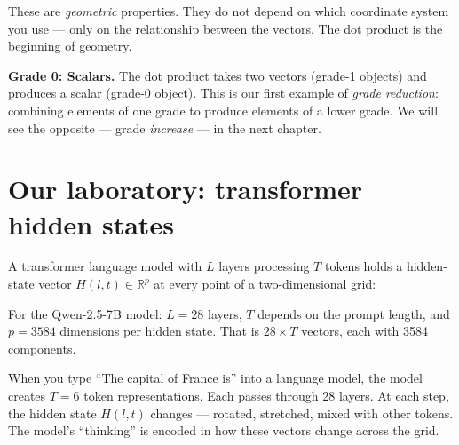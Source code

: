\documentclass[11pt, twoside, openright]{memoir}
\begin{document}
These are \emph{geometric} properties.  They do not depend on which
coordinate system you use --- only on the relationship between the
vectors.  The dot product is the beginning of geometry.

\begin{gabox}
\textbf{Grade 0: Scalars.}
The dot product takes two vectors (grade-1 objects) and produces a
scalar (grade-0 object).  This is our first example of \emph{grade
reduction}: combining elements of one grade to produce elements of a
lower grade.  We will see the opposite --- grade \emph{increase} --- in
the next chapter.
\end{gabox}

\section{Our laboratory: transformer hidden states}

A transformer language model with $L$ layers processing $T$ tokens holds
a hidden-state vector $H(l, t) \in \mathbb{R}^p$ at every point of a
two-dimensional grid:

\begin{center}
\end{center}

For the Qwen-2.5-7B model: $L = 28$ layers, $T$ depends on the prompt
length, and $p = 3584$ dimensions per hidden state.  That is
$28 \times T$ vectors, each with 3584 components.

\begin{transformer}
When you type ``The capital of France is'' into a language model, the
model creates $T = 6$ token representations.  Each passes through 28
layers.  At each step, the hidden state $H(l, t)$ changes --- rotated,
stretched, mixed with other tokens.  The model's ``thinking'' is encoded
in how these vectors change across the grid.
\end{transformer}
\end{document}
